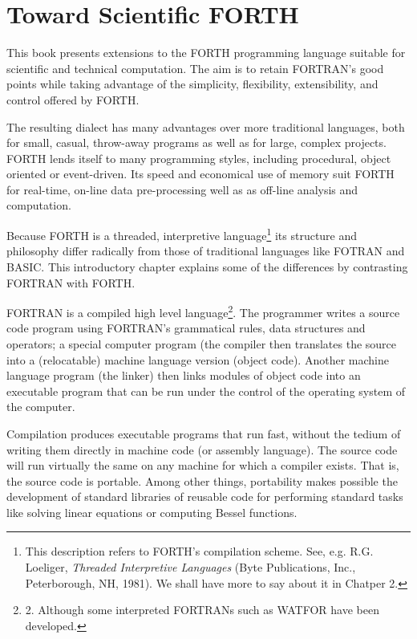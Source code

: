 \chapter{Toward Scientific FORTH}

This book presents extensions to the FORTH programming language suitable for scientific and technical computation. The aim is to retain FORTRAN's good points while taking advantage of the simplicity, flexibility, extensibility, and control offered by FORTH.

The resulting dialect has many advantages over more traditional languages, both for small, casual, throw-away programs as well as for large, complex projects. FORTH lends itself to many programming styles, including procedural, object oriented or event-driven. Its speed and economical use of memory suit FORTH for real-time, on-line data pre-processing well as as off-line analysis and computation.

Because FORTH is a threaded, interpretive language\footnote{This description refers to FORTH's compilation scheme. See, e.g. R.G. Loeliger, \textit{Threaded Interpretive Languages} (Byte Publications, Inc., Peterborough, NH, 1981). We shall have more to say about it in Chatper 2.} its  structure and philosophy differ radically from those of traditional languages like FOTRAN and BASIC. This introductory chapter explains some of the differences by contrasting FORTRAN with FORTH.


FORTRAN is a compiled high level language\footnote{2. Although some interpreted FORTRANs such as WATFOR have been developed.}. The programmer writes a source code program using FORTRAN's grammatical rules, data structures and operators; a special computer program (the compiler then translates the source into a (relocatable) machine language version (object code). Another machine language program (the linker) then links modules of object code into an executable program that can be run under the control of the operating system of the computer.

Compilation produces executable programs that run fast, without the tedium of writing them directly in machine code (or assembly language). The source code will run virtually the same on any machine for which a compiler exists. That is, the source code is 
portable. Among other things, portability makes possible the development of standard libraries of reusable code for performing standard tasks like solving linear equations or computing Bessel functions.

